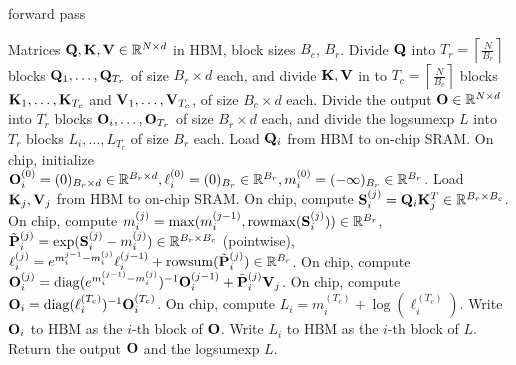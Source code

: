 \begin{algorithm}[H]
  \caption{\small\label{alg:flash2_fwd}\sysname forward pass}
  \begin{algorithmic}[1]
    \REQUIRE Matrices $\mathbf{Q}, \mathbf{K}, \mathbf{V} \in \mathbb{R}^{N \times d}$ in HBM, block sizes $B_c$, $B_r$.
    \STATE \label{alg:stream_attn_split_qkv} Divide $\mathbf{Q}$ into $T_r = \left\lceil\frac{N}{B_r} \right\rceil$ blocks $\mathbf{Q}_1, \dots, \mathbf{Q}_{T_r}$ of size $B_r \times d$ each,
    and divide $\mathbf{K}, \mathbf{V}$ in to $T_c = \left\lceil \frac{N}{B_c} \right\rceil$ blocks $\mathbf{K}_1, \dots, \mathbf{K}_{T_c}$ and
    $\mathbf{V}_1, \dots, \mathbf{V}_{T_c}$, of size $B_c \times d$ each.
    \STATE Divide the output $\mathbf{O} \in \mathbb{R}^{N \times d}$ into $T_r$ blocks $\mathbf{O}_i, \dots, \mathbf{O}_{T_r}$ of size
    $B_r \times d$ each, and divide the logsumexp $L$ into $T_r$ blocks $L_i, \dots, L_{T_r}$ of size
    $B_r$ each.
     \label{alg:stream_attn_outer_loop}
      \STATE \label{alg:stream_attn_load_q} Load $\mathbf{Q}_i$ from HBM to on-chip SRAM.
      \STATE \label{alg:stream_attn_init} On chip, initialize $\mathbf{O}_{i}^{(0)} = (0)_{B_r \times d} \in \mathbb{R}^{B_r \times d}, \ell_{i}^{(0)} = (0)_{B_r} \in \mathbb{R}^{B_r}, m_{i}^{(0)} = (-\infty)_{B_r} \in \mathbb{R}^{B_r}$.
        \STATE \label{alg:stream_attn_load_kv} Load $\mathbf{K}_j, \mathbf{V}_j$ from HBM to on-chip SRAM.
        \STATE \label{alg:stream_attn_qk} On chip, compute $\mathbf{S}_{i}^{(j)} = \mathbf{Q}_i \mathbf{K}_j^T \in \mathbb{R}^{B_r \times B_c}$.
        \STATE \label{alg:stream_attn_statistics} On chip, compute
        $m_{i}^{(j)} = \mathrm{max}(m_{i}^{(j-1)}, \mathrm{rowmax}(\mathbf{S}_{i}^{(j)})) \in \mathbb{R}^{B_r}$, $\tilde{\mathbf{P}}_{i}^{(j)} = \exp(\mathbf{S}_{i}^{(j)} - m_{i}^{(j)}) \in \mathbb{R}^{B_r \times B_c}$ (pointwise),
        $\ell_{i}^{(j)} = e^{m_{i}^{j-1} - m_{i}^{(j)}} \ell_{i}^{(j-1)} + \mathrm{row sum}(\tilde{\mathbf{P}}_{i}^{(j)}) \in \mathbb{R}^{B_r}$.
        \STATE \label{alg:stream_attn_update} On chip, compute
        $\mathbf{O}_{i}^{(j)} = \mathrm{diag}(e^{m_{i}^{(j-1)} - m_{i}^{(j)}})^{-1} \mathbf{O}_{i}^{(j-1)} + \tilde{\mathbf{P}}_{i}^{(j)} \mathbf{V}_j$.
      \ENDFOR
      \STATE On chip, compute $\mathbf{O}_{i} = \mathrm{diag}(\ell_{i}^{(T_c)})^{-1} \mathbf{O}_{i}^{(T_c)}$.
      \STATE On chip, compute $L_{i} = m_{i}^{(T_c)} + \log(\ell_i^{(T_c)})$.
      \STATE Write $\mathbf{O}_{i}$ to HBM as the $i$-th block of $\mathbf{O}$.
      \STATE Write $L_{i}$ to HBM as the $i$-th block of $L$.
    \ENDFOR
    \STATE Return the output $\mathbf{O}$ and the logsumexp $L$.
  \end{algorithmic}
\end{algorithm}

